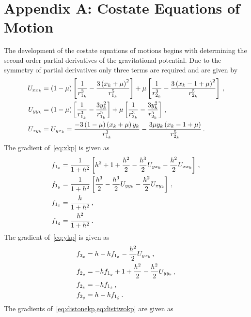 \documentclass[letterpaper, paper,11pt]{AAS}		%
\begin{document}
\appendix
\section*{Appendix A: Costate Equations of Motion}\label{sec:costate_appendix}
The development of the costate equations of motions begins with determining the second order partial derivatives of the gravitational potential. 
Due to the symmetry of partial derivatives only three terms are required and are given by
\begin{align}\label{eq:second_discrete_potential_grad}
	U_{x\xk} &= \parenth{1-\mu} \bracket{\frac{1}{\distonek^3} - \frac{3 \parenth{\xk +\mu}^2}{\distonek^5}} + \mu \bracket{\frac{1}{\disttwok^3} - \frac{3 \parenth{\xk -1 + \mu}^2}{\disttwok^5}} \, ,\\
	U_{y\yk} &= \parenth{1-\mu} \bracket{\frac{1}{\distonek^3} - \frac{3 \yk^2}{\distonek^5}} + \mu \bracket{\frac{1}{\disttwok^3} - \frac{3 \yk^2}{\disttwok^5}} \, ,\\
	U_{x\yk} &= U_{y\xk} =  \frac{-3 \parenth{1-\mu} \parenth{\xk +\mu} \yk}{\distonek^3} - \frac{3\mu\yk\parenth{\xk-1+\mu}}{\disttwok^5} \, .
\end{align}
The gradient of~\cref{eq:xkp} is given as
\begin{subequations}\label{eq:xkp_grad}
\begin{align}
	f_{1_x} &= \frac{1}{1+h^2} \left[ h^2 + 1 + \frac{h^2}{2} -\frac{h^3}{2} U_{yx_k} - \frac{h^2}{2}U_{xx_k} \right] \, ,\\
	f_{1_y} &= \frac{1}{1+h^2} \left[  \frac{h^3}{2} -\frac{h^3}{2} U_{yy_{k}} - \frac{h^2}{2}U_{xy_{k}} \right] \, ,\\
	f_{1_{\dot{x}}} &= \frac{h}{1+h^2} \, ,\\
	f_{1_{\dot{y}}} &= \frac{h^2}{1+h^2} \, .
\end{align}
\end{subequations}
The gradient of~\cref{eq:ykp} is given as
\begin{subequations}\label{eq:ykp_grad}
\begin{align}
	f_{2_x} &= h -h f_{1_x} - \frac{h^2}{2} U_{yx_k} \, , \\
	f_{2_y} &= -h f_{1_y} + 1 + \frac{h^2}{2} - \frac{h^2}{2} U_{yy_{k}} \, ,\\
	f_{2_{\dot{x}}} &= -h f_{1_{\dot{x}}} \, ,\\
	f_{2_{\dot{y}}} &= h - h f_{1_{\dot{y}}} \, .
\end{align}
\end{subequations}
The gradients of~\cref{eq:distonekp,eq:disttwokp} are given as
\end{document}
